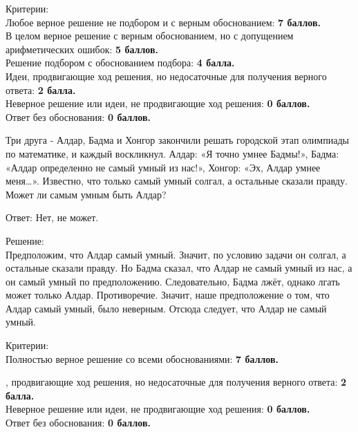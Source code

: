 \hspace{3mm}

Критерии:\\
Любое верное решение не подбором и с верным обоснованием: \textbf{7 баллов.}\\
В целом верное решение с верным обоснованием, но с допущением арифметических ошибок: \textbf{5 баллов.}\\
Решение подбором с обоснованием подбора: \textbf{4 балла.}\\
Идеи, продвигающие ход решения, но недосаточные для получения верного ответа: \textbf{2 балла.}\\
Неверное решение или идеи, не продвигающие ход решения: \textbf{0 баллов.} \\
Ответ без обоснования: \textbf{0 баллов.}

\hspace{3mm}

Три друга - Алдар, Бадма и Хонгор закончили решать городской этап олимпиады по математике, и каждый воскликнул. Алдар: «Я точно умнее Бадмы!», Бадма: «Алдар определенно не самый умный из нас!», Хонгор: «Эх, Алдар умнее меня…». Известно, что только самый умный солгал, а остальные сказали правду. Может ли самым умным быть Алдар?

\hspace{3mm}

Ответ: Нет, не может.

Решение:\\
Предположим, что Алдар самый умный. Значит, по условию задачи он солгал, а остальные сказали правду. Но Бадма сказал, что Алдар не самый умный из нас, а он самый умный по предположению. Следовательно, Бадма лжёт, однако лгать может только Алдар. Противоречие. Значит, наше предположение о том, что Алдар самый умный, было неверным. Отсюда следует, что Алдар не самый умный.  

\hspace{3mm}

Критерии:\\
Полностью верное решение со всеми обоснованиями: \textbf{7 баллов.}\\

\newpage
\hspace{3mm}

, продвигающие ход решения, но недосаточные для получения верного ответа: \textbf{2 балла.}\\
Неверное решение  или идеи, не продвигающие ход решения: \textbf{0 баллов.}\\
Ответ без обоснования: \textbf{0 баллов.}


